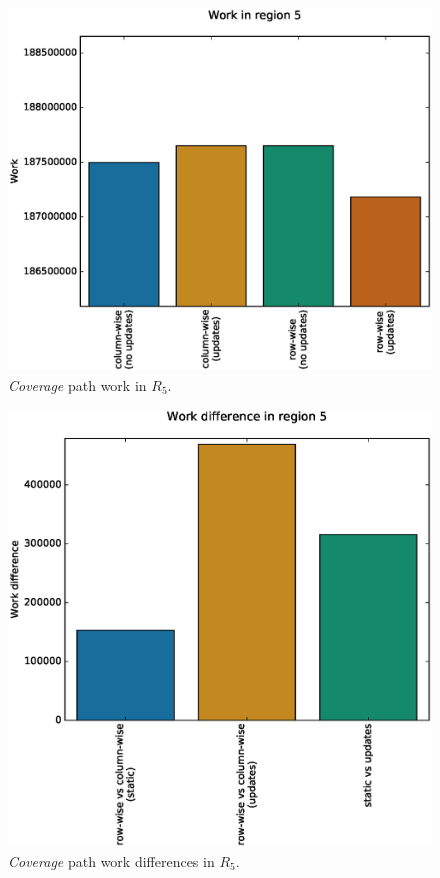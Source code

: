 \documentclass{tamuccthesis}
\begin{document}
\begin{figure}
    \captionsetup{justification=centering}
    \centering
    \includegraphics[width=\textwidth,trim={0cm 0cm 0cm 0.75cm},clip]{work_r5.eps}
    \caption{\textit{Coverage} path work in $R_5$.}
    \label{fig:coverage_noterrain_work_r5}
\end{figure}
\begin{figure}
    \captionsetup{justification=centering}
    \centering
    \includegraphics[width=\textwidth,trim={0cm 0cm 0cm 0.75cm},clip]{diff_r5.eps}
    \caption{\textit{Coverage} path work differences in $R_5$.}
    \label{fig:coverage_noterrain_diff_r5}
\end{figure}
\end{document}
